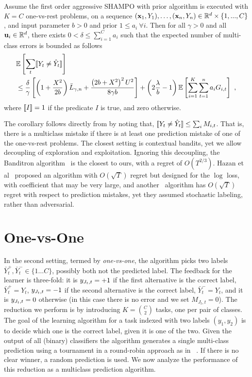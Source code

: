 \begin{corollary}
Assume the first order aggressive SHAMPO with prior algorithm is executed with $K=C$ one-vs-rest 
problems, on a sequence 
$(\mathbf{x}_1,Y_1),\ldots,(\mathbf{x}_n,Y_n)\in\mathbb{R}^d\times\{1,...,C\}$, and input parameter $b>0$  and prior 
$1\le a_i~\forall i$. Then for all $\gamma>0$ and all $\mathbf{u}_{i}\in\mathbb{R}^d$, there 
exists $0<\delta\le \sum_{i=1}^{C}a_{i}$ such that the expected number of multi-class errors is bounded as follows
 \[
 \begin{split}
 &\mathbb{E}\left[{\sum_t [\![{Y_t \neq \hat{Y}_t}]\!]}\right]\\
 &\le \frac{\delta}{\gamma}\left[{\left(1+\frac{X^2}{2b} \right){\bar L}_{\gamma,n}+
 \frac{\left({2b+X^2}\right)^2U^2}{8{\gamma}b}}\right]
 +\left({2\frac{\lambda}{b}-1}\right)\mathbb{E}\left[{\sum_{i=1}^{K}\sum_{t=1}^{n}{a_{i}G_{i,t}}}\right]~,
 \end{split}
 \]
where $[\![{I}]\!]=1$ if the predicate $I$ is true, and zero otherwise.
\end{corollary}

\noindent
The corollary follows directly from  by noting that, 
$[\![{Y_t \neq \hat{Y}_t}]\!] \leq \sum_i M_{i,t}$. That is, there is a multiclass mistake if there is at least one 
prediction mistake of one of the one-vs-rest problems. The closest setting is contextual bandits, yet we 
allow decoupling of exploration and exploitation. Ignoring this decoupling, the 
Banditron algorithm~\cite{kakade2008efficient} is the closest to ours, 
with a regret of $O(T^{2/3})$. Hazan et al~\cite{hazan2011newtron} proposed an algorithm 
with $O(\sqrt{T})$ regret but designed for the $\log$ loss, with coefficient that may be very large, and 
another~\cite{DBLP:journals/ml/CrammerG13} algorithm has $O(\sqrt{T})$ regret with respect to prediction 
mistakes, yet they assumed stochastic labeling, rather than adversarial.


\section{One-vs-One}
In the second setting, termed by {\em one-vs-one}, the algorithm picks two labels 
$\bar{Y}^+_t,\bar{Y}^-_t \in\{1\dots C\}$, possibly both not the predicted label. 
The feedback for the learner is three-fold: it is $y_{J_t,t}=+1$ if the first alternative is the correct label, 
$\bar{Y}^+_t=Y_t$, $y_{J_t,t}=-1$ if the second alternative is the correct label, $\bar{Y}^-_t=Y_t$, 
and it is $y_{J_t,t}=0$ otherwise (in this case there is no error and we set $M_{J_t,t}=0$). 
The reduction we perform is by introducing $K= {C \choose 2}$ tasks, one per pair of classes.  
The goal of the learning algorithm for a task indexed with two labels $(y_1,y_2)$ is to decide 
which one is the correct label, given it is one of the two. Given the output of all (binary) classifiers the 
algorithm generates a single multi-class prediction using a tournament in a round-robin 
approach as in ~\cite{DBLP:journals/jmlr/Furnkranz02}. If there is no clear winner, a random prediction is used. 
We now analyze the performance of this reduction as a multiclass prediction algorithm.

